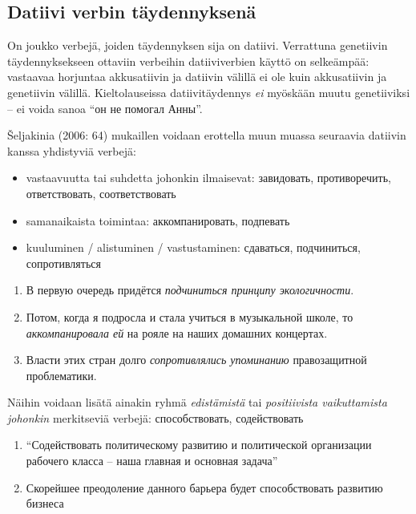 \documentclass[]{scrreprt}
\providecommand{\tightlist}{%
  \setlength{\itemsep}{0pt}\setlength{\parskip}{0pt}}
\begin{document}
\subsection{Datiivi verbin
täydennyksenä}\label{datiivi-verbin-tuxe4ydennyksenuxe4}

On joukko verbejä, joiden täydennyksen sija on datiivi. Verrattuna
genetiivin täydennyksekseen ottaviin verbeihin datiiviverbien käyttö on
selkeämpää: vastaavaa horjuntaa akkusatiivin ja datiivin välillä ei ole
kuin akkusatiivin ja genetiivin välillä. Kieltolauseissa
datiivitäydennys \emph{ei} myöskään muutu genetiiviksi -- ei voida sanoa
``он не помогал Анны''.

Šeljakinia (2006: 64) mukaillen voidaan erottella muun muassa seuraavia
datiivin kanssa yhdistyviä verbejä:

\begin{itemize}
\tightlist
\item
  vastaavuutta tai suhdetta johonkin ilmaisevat: завидовать,
  противоречить, ответствовать, соответствовать
\item
  samanaikaista toimintaa: аккомпанировать, подпевать
\item
  kuuluminen / alistuminen / vastustaminen: сдаваться, подчиниться,
  сопротивляться
\end{itemize}

\begin{enumerate}
\def\labelenumi{(\arabic{enumi})}
\setcounter{enumi}{92}
\tightlist
\item
  В первую очередь придётся \emph{подчиниться принципу экологичности}.
\item
  Потом, когда я подросла и стала учиться в музыкальной школе, то
  \emph{аккомпанировала ей} на рояле на наших домашних концертах.
\item
  Власти этих стран долго \emph{сопротивлялись упоминанию} правозащитной
  проблематики.
\end{enumerate}

Näihin voidaan lisätä ainakin ryhmä \emph{edistämistä} tai
\emph{positiivista vaikuttamista johonkin} merkitseviä verbejä:
способствовать, содействовать

\begin{enumerate}
\def\labelenumi{(\arabic{enumi})}
\setcounter{enumi}{95}
\tightlist
\item
  ``Содействовать политическому развитию и политической организации
  рабочего класса -- наша главная и основная задача''
\item
  Скорейшее преодоление данного барьера будет способствовать развитию
  бизнеса
\end{enumerate}
\end{document}
